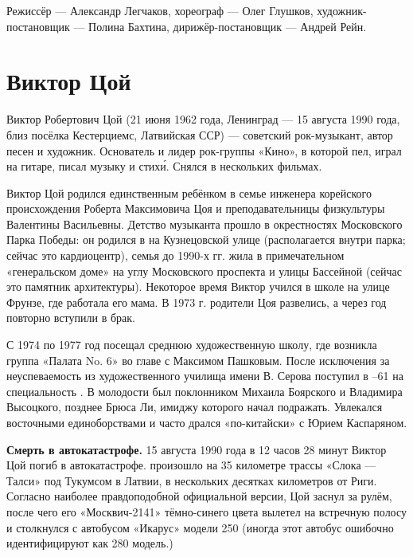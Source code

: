 Режиссёр --- Александр Легчаков, хореограф --- Олег Глушков, художник-постановщик --- Полина Бахтина, дирижёр-постановщик --- Андрей Рейн.

\newpage
\section{Виктор Цой}
Виктор Робертович Цой (21 июня 1962 года, Ленинград --- 15 августа 1990 года, близ посёлка Кестерциемс, Латвийская ССР) --- советский рок-музыкант, автор песен и художник. Основатель и лидер рок-группы «Кино», в которой пел, играл на гитаре, писал музыку и стих\'{и}. Снялся в нескольких фильмах.

Виктор Цой родился единственным ребёнком в семье инженера корейского происхождения Роберта Максимовича Цоя и преподавательницы физкультуры Валентины Васильевны. Детство музыканта прошло в окрестностях Московского Парка Победы: он родился в  на Кузнецовской улице (располагается внутри парка; сейчас это кардиоцентр), семья до 1990-х гг. жила в примечательном «генеральском доме» на углу Московского проспекта и улицы Бассейной (сейчас это памятник архитектуры). Некоторое время Виктор учился в  школе на улице Фрунзе, где работала его мама. В 1973 г. родители Цоя развелись, а через год повторно вступили в брак.

С 1974 по 1977 год посещал среднюю художественную школу, где возникла группа «Палата No. 6» во главе с Максимом Пашковым.
После исключения за неуспеваемость из художественного училища имени В. Серова поступил в --61 на специальность .
В молодости был поклонником Михаила Боярского и Владимира Высоцкого, позднее Брюса Ли, имиджу которого начал подражать.
Увлекался восточными единоборствами и часто дрался «по-китайски» с Юрием Каспаряном.

\textbf{Смерть в автокатастрофе.}
15 августа 1990 года в 12 часов 28 минут Виктор Цой погиб в автокатастрофе.  произошло на 35 километре трассы «Слока --- Талси» под Тукумсом в Латвии, в нескольких десятках километров от Риги. Согласно наиболее правдоподобной официальной версии, Цой заснул за рулём, после чего его «Москвич-2141» тёмно-синего цвета вылетел на встречную полосу и столкнулся с автобусом «Икарус» модели 250 (иногда этот автобус ошибочно идентифицируют как 280 модель.)

